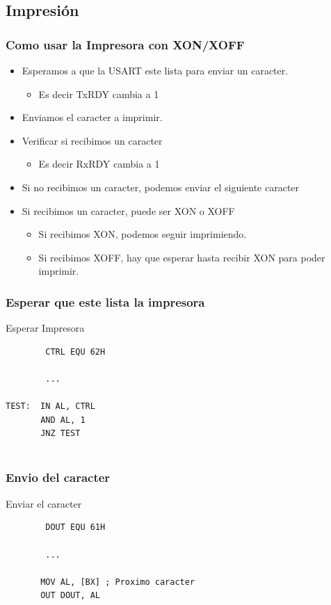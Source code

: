 \documentclass{beamer}
\begin{document}
\subsection{Impresión}
\begin{frame}[fragile]
\frametitle{Como usar la Impresora con XON/XOFF}

\begin{itemize}
\item Esperamos a que la USART este lista para enviar un caracter. 
\begin{itemize}
\item Es decir TxRDY cambia a 1 
\end{itemize}
\item Enviamos el caracter a imprimir. 
\item Verificar si recibimos un caracter
\begin{itemize}
 \item Es decir RxRDY cambia a 1
\end{itemize}
\item Si no recibimos un caracter, podemos enviar el siguiente caracter
\item Si recibimos un caracter, puede ser XON o XOFF
\begin{itemize}
\item Si recibimos XON, podemos seguir imprimiendo.
\item Si recibimos XOFF, hay que esperar hasta recibir XON para poder imprimir.
\end{itemize}
\end{itemize}

\end{frame}

\begin{frame}[fragile]
\frametitle{Esperar que este lista la impresora}
\begin{block}{Esperar Impresora}
 \begin{verbatim}
        CTRL EQU 62H
         
        ...
           
TEST:  IN AL, CTRL
       AND AL, 1
       JNZ TEST
             
 \end{verbatim}
\end{block}

\end{frame}

\begin{frame}[fragile]
\frametitle{Envio del caracter}
\begin{block}{Enviar el caracter}
 \begin{verbatim}
        DOUT EQU 61H
         
        ...
           
       MOV AL, [BX] ; Proximo caracter
       OUT DOUT, AL
             
 \end{verbatim}
\end{block}

\end{frame}
\end{document}
